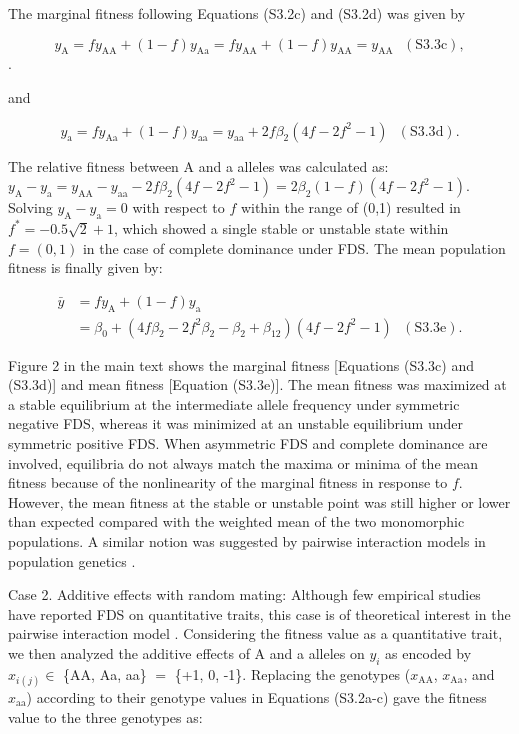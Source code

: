 \documentclass[12pt,]{article}
\begin{document}
\noindent
The marginal fitness following Equations (S3.2c) and (S3.2d) was given by 

$$y_\mathrm{A} = fy_\mathrm{AA} + (1-f)y_\mathrm{Aa} = fy_\mathrm{AA} + (1-f)y_\mathrm{AA} = y_\mathrm{AA}~~~(\mathrm{S3.3c}),$$.

\noindent
and

$$y_\mathrm{a} = fy_\mathrm{Aa} + (1-f)y_\mathrm{aa} = y_\mathrm{aa} + 2f\beta_2(4f-2f^2-1)~~~(\mathrm{S3.3d}).$$

\noindent
The relative fitness between A and a alleles was calculated as: $y_\mathrm{A} - y_\mathrm{a} = y_\mathrm{AA} - y_\mathrm{aa} - 2f\beta_2(4f-2f^2-1) = 2\beta_2(1-f)(4f-2f^2-1)$. Solving $y_\mathrm{A} - y_\mathrm{a} = 0$ with respect to $f$ within the range of (0,1) resulted in $f^*=-0.5\sqrt{2}+1$, which showed a single stable or unstable state within $f=(0,1)$ in the case of complete dominance under FDS. The mean population fitness is finally given by:

\begin{equation*}
\begin{split}
\bar{y} &= fy_\mathrm{A} + (1-f)y_\mathrm{a} \\
&= \beta_0 + (4f\beta_2-2f^2\beta_2-\beta_2+\beta_{12})(4f-2f^2-1)~~~(\mathrm{S3.3e}).
\end{split}
\end{equation*}

\noindent
Figure 2 in the main text shows the marginal fitness [Equations (S3.3c) and (S3.3d)] and mean fitness [Equation (S3.3e)]. The mean fitness was maximized at a stable equilibrium at the intermediate allele frequency under symmetric negative FDS, whereas it was minimized at an unstable equilibrium under symmetric positive FDS. When asymmetric FDS and complete dominance are involved, equilibria do not always match the maxima or minima of the mean fitness because of the nonlinearity of the marginal fitness in response to $f$. However, the mean fitness at the stable or unstable point was still higher or lower than expected compared with the weighted mean of the two monomorphic populations. A similar notion was suggested by pairwise interaction models in population genetics \citep{cockerham1972frequency, schneider_maximization_2008}.

Case 2. Additive effects with random mating: Although few empirical studies have reported FDS on quantitative traits, this case is of theoretical interest in the pairwise interaction model \citep{schneider_maximization_2008}. Considering the fitness value as a quantitative trait, we then analyzed the additive effects of A and a alleles on $y_i$ as encoded by $x_{i(j)} \in $ \{AA, Aa, aa\} $=$ \{+1, 0, -1\}. Replacing the genotypes ($x_\mathrm{AA}$, $x_\mathrm{Aa}$, and $x_\mathrm{aa}$) according to their genotype values in Equations (S3.2a-c) gave the fitness value to the three genotypes as:
\end{document}
